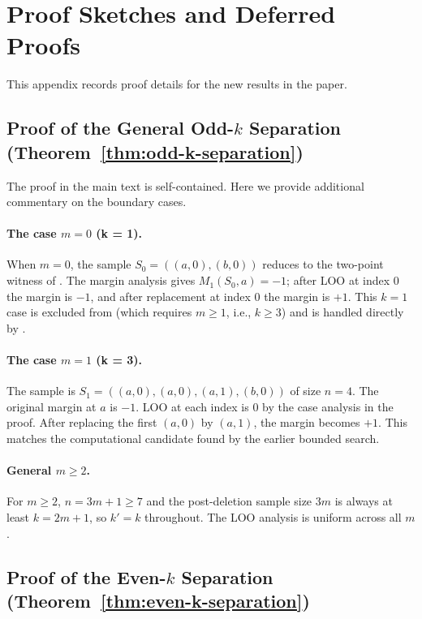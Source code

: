\section{Proof Sketches and Deferred Proofs}

This appendix records proof details for the new results in the paper.

\subsection{Proof of the General Odd-$k$ Separation (Theorem~\ref{thm:odd-k-separation})}

The proof in the main text is self-contained. Here we provide additional
commentary on the boundary cases.

\paragraph{The case $m = 0$ (k = 1).}
When $m = 0$, the sample $S_0 = ((a,0), (b,0))$ reduces to the two-point witness
of .  The margin analysis gives $M_1(S_0,a) = -1$; after LOO at
index $0$ the margin is $-1$, and after replacement at index $0$ the margin is
$+1$.  This $k=1$ case is excluded from  (which
requires $m \ge 1$, i.e., $k \ge 3$) and is handled directly by
.

\paragraph{The case $m = 1$ (k = 3).}
The sample is $S_1 = ((a,0), (a,0), (a,1), (b,0))$ of size $n=4$. The
original margin at $a$ is $-1$. LOO at each index is $0$ by the case analysis
in the proof. After replacing the first $(a,0)$ by $(a,1)$, the margin becomes
$+1$. This matches the computational candidate found by the earlier bounded
search.

\paragraph{General $m \ge 2$.}
For $m \ge 2$, $n = 3m+1 \ge 7$ and the post-deletion sample size $3m$ is
always at least $k = 2m+1$, so $k' = k$ throughout. The LOO analysis is
uniform across all $m$.

\subsection{Proof of the Even-$k$ Separation (Theorem~\ref{thm:even-k-separation})}

